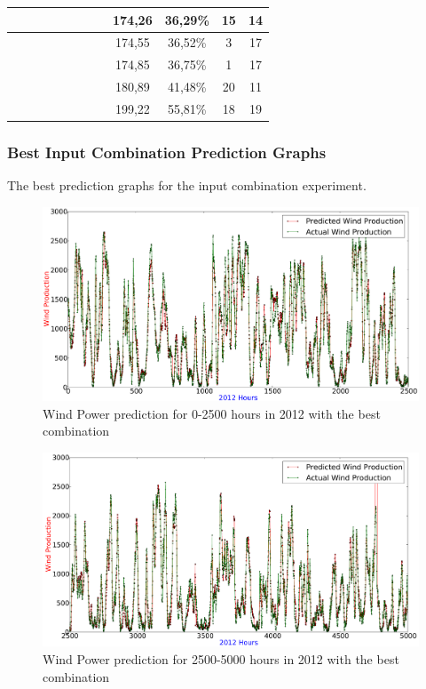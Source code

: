 \begin{center}
\begin{longtable}{|c|c|c|c|c|c|c|c|c|c|c|c|}
 \x &  \x &  \x &  \x &  \x &  \x &  \x &  \x & 174,26 & 36,29\% & 15 & 14  \\ \hline
 \x &  \x &  &  \x &  &  \x &  \x &  \x & 174,55 & 36,52\% & 3 & 17  \\ \hline
 \x &  &  &  \x &  &  \x &  \x &  \x & 174,85 & 36,75\% & 1 & 17  \\ \hline
 \x &  \x &  \x &  &  \x &  \x &  \x &  & 180,89 & 41,48\% & 20 & 11  \\ \hline
 \x &  \x &  &  &  \x &  \x &  \x &  \x & 199,22 & 55,81\% & 18 & 19  \\ \hline
\end{longtable}
\label{table:windProdInputParams}
\end{center}
\normalsize

\subsubsection{Best Input Combination Prediction Graphs}
\label{sec:bestCombiPredictionsGraphs}
The best prediction graphs for the input combination experiment.

\begin{figure}
\centering
\includegraphics[width=0.99\linewidth]{billeder/bestInputCombi0-2500.png}
\caption{Wind Power prediction for 0-2500 hours in 2012 with the best combination}
\label{fig:bestInputCombi0-2500}
\end{figure} 

\begin{figure}
\centering
\includegraphics[width=0.99\linewidth]{billeder/bestInputCombi2500-5000.png}
\caption{Wind Power prediction for 2500-5000 hours in 2012 with the best combination}
\label{fig:bestInputCombi2500-5000}
\end{figure} 

